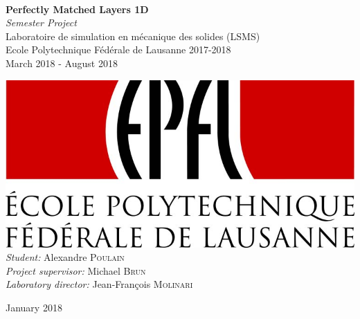 \begin{titlepage}
\begin{sffamily}
\begin{center}
    \vspace*{2cm}
    \noindent\hrulefill \\
    \vspace*{1cm}
    {\huge \bfseries Perfectly Matched Layers 1D}\\[0.5cm]
    {\huge  \itshape Semester Project} \\[0.5cm]
    {\large Laboratoire de simulation en mécanique des solides (LSMS)}\\[0.5cm]
    {\large Ecole Polytechnique Fédérale de Lausanne 2017-2018}\\[1cm]
    
    March 2018 - August 2018 \\[1cm]
    \noindent\hrulefill 
    \vspace{2cm}
    


      \includegraphics{images/EPFL-Logo.jpg}\\[1cm]
      

    \emph{Student:} Alexandre \textsc{Poulain}\\[1cm]
    \emph{Project supervisor:} Michael \textsc{Brun}\\[1cm]
    \emph{Laboratory director:} Jean-François \textsc{Molinari}

    
    
    \vfill{\large January 2018}

\end{center}
\end{sffamily}
\end{titlepage}
